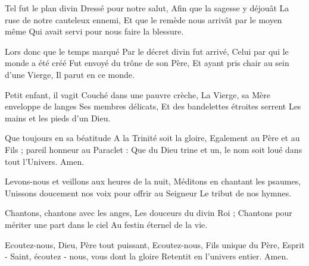\documentclass[psautier_nocturne_fr.tex]{subfiles}
\begin{document}
Tel fut le plan divin
Dressé pour notre salut,
Afin que la sagesse y déjouât
La ruse de notre cauteleux ennemi,
Et que le remède nous arrivât par le moyen même
Qui avait servi pour nous faire la blessure.

Lors donc que le temps marqué
Par le décret divin fut arrivé,
Celui par qui le monde a été créé
Fut envoyé du trône de son Père,
Et ayant pris chair au sein d'une Vierge,
Il parut en ce monde.

Petit enfant, il vagit
Couché dans une pauvre crèche,
La Vierge, sa Mère enveloppe de langes
Ses membres délicats,
Et des bandelettes étroites serrent
Les mains et les pieds d'un Dieu.

Que toujours en sa béatitude
A la Trinité soit la gloire,
Egalement au Père et au Fils ;
pareil honneur au Paraclet :
Que du Dieu trine et un, le nom
soit loué dans tout l’Univers.
Amen.

Levons-nous et veillons aux heures de la nuit,
Méditons en chantant les psaumes,
Unissons doucement nos voix pour offrir au Seigneur
Le tribut de nos hymnes.

Chantons, chantons avec les anges,
Les douceurs du divin Roi ;
Chantons pour mériter une part dans le ciel
Au festin éternel de la vie.

Ecoutez-nous, Dieu, Père tout puissant,
Ecoutez-nous, Fils unique du Père,
Esprit - Saint, écoutez - nous, vous dont la gloire
Retentit en l'univers entier.
Amen.


\begin{paracol}{2}
\switchcolumn
{}
\end{paracol}

\begin{paracol}{2}
\switchcolumn
\versiculus{}{}
\end{paracol}
\end{document}
